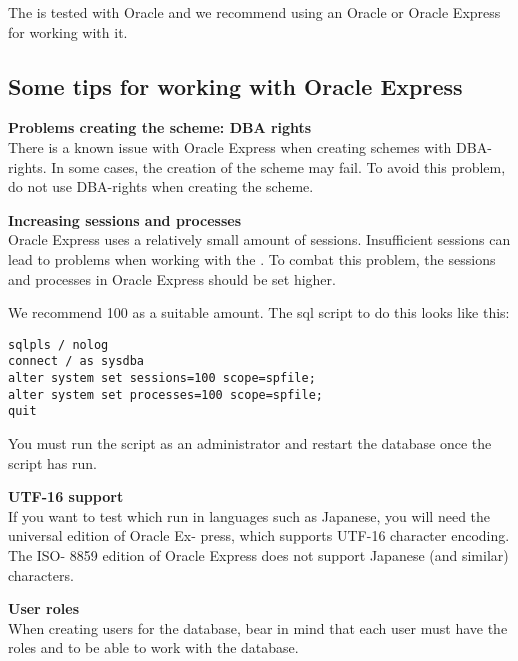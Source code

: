 The \ite{} is tested with Oracle and we recommend using an Oracle or Oracle Express \gddb{} for working with it. 

\subsection{Some tips for working with Oracle Express}

\textbf{Problems creating the \gddb{} scheme: DBA rights}\\

There is a known issue with Oracle Express when creating \gddb{} schemes with DBA-rights. In some cases, the creation of the \gddb{} scheme may fail.
To avoid this problem, do not use DBA-rights when creating the \gddb{} scheme.
 
\textbf{Increasing sessions and processes}\\

Oracle Express uses a relatively small amount of sessions. Insufficient sessions can lead to problems when working with the \ite{}. To combat this problem, the sessions and processes in Oracle Express should be set higher. 

We recommend 100 as a suitable amount. The sql script to do this looks like this:
\begin{verbatim}
sqlpls / nolog
connect / as sysdba
alter system set sessions=100 scope=spfile;
alter system set processes=100 scope=spfile;
quit
\end{verbatim}

You must run the script as an administrator and restart the
database once the script has run.


\textbf{UTF-16 support}\\
If you want to test \gdauts{} which run in languages such as
Japanese, you will need the universal edition of Oracle Ex-
press, which supports UTF-16 character encoding. The ISO-
8859 edition of Oracle Express does not support Japanese
(and similar) characters.

\textbf{User roles}\\

When creating users for the database, bear in mind that each
user must have the roles  and  to be able to
work with the database.
